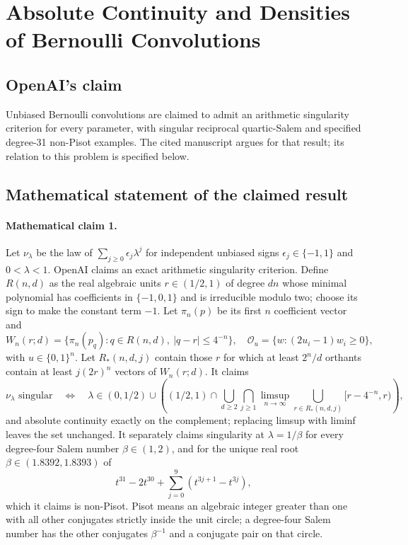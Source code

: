 \documentclass[11pt]{article}
\begin{document}
\section*{Absolute Continuity and Densities of Bernoulli Convolutions}

\subsection{OpenAI's claim}
Unbiased Bernoulli convolutions are claimed to admit an arithmetic singularity criterion for every parameter, with singular reciprocal quartic-Salem and specified degree-31 non-Pisot examples. The cited manuscript argues for that result; its relation to this problem is specified below.

\subsection{Mathematical statement of the claimed result}
\paragraph{Mathematical claim 1.} Let $\nu_\lambda$ be the law of $\sum_{j\ge0}\epsilon_j\lambda^j$ for independent unbiased signs $\epsilon_j\in\{-1,1\}$ and $0<\lambda<1$. OpenAI claims an exact arithmetic singularity criterion. Define $R(n,d)$ as the real algebraic units $r\in(1/2,1)$ of degree $dn$ whose minimal polynomial has coefficients in $\{-1,0,1\}$ and is irreducible modulo two; choose its sign to make the constant term $-1$. Let $\pi_n(p)$ be its first $n$ coefficient vector and
\[
W_n(r;d)=\{\pi_n(p_q):q\in R(n,d),\ |q-r|\le4^{-n}\},\quad
\mathcal O_u=\{w:(2u_i-1)w_i\ge0\},
\]
with $u\in\{0,1\}^n$. Let $R_*(n,d,j)$ contain those $r$ for which at least $2^n/d$ orthants contain at least $j(2r)^n$ vectors of $W_n(r;d)$. It claims
\[
\nu_\lambda\text{ singular}\quad\Longleftrightarrow\quad
\lambda\in(0,1/2)\cup\left((1/2,1)\cap\bigcup_{d\ge2}\bigcap_{j\ge1}\limsup_{n\to\infty}\bigcup_{r\in R_*(n,d,j)}[r-4^{-n},r)\right),
\]
and absolute continuity exactly on the complement; replacing limsup with liminf leaves the set unchanged.
It separately claims singularity at $\lambda=1/\beta$ for every degree-four Salem number $\beta\in(1,2)$, and for the unique real root $\beta\in(1.8392,1.8393)$ of
\[
t^{31}-2t^{30}+\sum_{j=0}^9(t^{3j+1}-t^{3j}),
\]
which it claims is non-Pisot. Pisot means an algebraic integer greater than one with all other conjugates strictly inside the unit circle; a degree-four Salem number has the other conjugates $\beta^{-1}$ and a conjugate pair on that circle.
\end{document}

